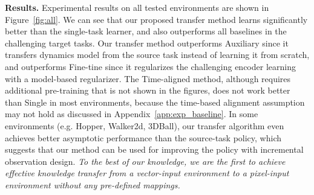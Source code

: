 %   
%    
%    
%    

\textbf{Results.}
Experimental results on all tested environments are shown in Figure~\ref{fig:all}. We can see that our proposed transfer method learns significantly better than the single-task learner, and also outperforms all baselines in the challenging target tasks. 
Our transfer method outperforms Auxiliary since it transfers dynamics model from the source task instead of learning it from scratch, and outperforms Fine-tine since it regularizes the challenging encoder learning with a model-based regularizer.
The Time-aligned method, although requires additional pre-training that is not shown in the figures, does not work better than Single in most environments, because the time-based alignment assumption may not hold as discussed in Appendix~\ref{app:exp_baseline}.
In some environments (e.g. Hopper, Walker2d, 3DBall), our transfer algorithm even achieves better asymptotic performance than the source-task policy, which suggests that our method can be used for improving the policy with incremental observation design.
\textit{To the best of our knowledge, we are the first to achieve effective knowledge transfer from a vector-input environment to a pixel-input environment without any pre-defined mappings.}

